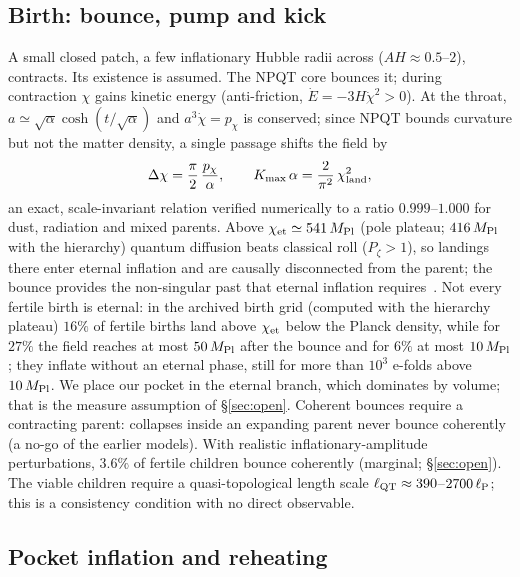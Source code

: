 \documentclass[11pt,a4paper]{article}
\newcommand{\Mpl}{M_{\rm Pl}}
\begin{document}
\subsection{Birth: bounce, pump and kick}
\label{sec:birth}

A small closed patch, a few inflationary Hubble radii across ($A H \approx 0.5$--$2$), contracts.
Its existence is assumed.
The NPQT core bounces it; during contraction $\chi$ gains kinetic energy (anti-friction, $\dot E = -3H\dot\chi^2 > 0$).
At the throat, $a\simeq\sqrt{\alpha}\cosh(t/\sqrt{\alpha})$ and $a^3\dot\chi = p_\chi$ is conserved; since NPQT bounds curvature but not the matter density, a single passage shifts the field by
\begin{equation}
\Delta\chi = \frac{\pi}{2}\,\frac{p_\chi}{\alpha},\qquad K_{\max}\,\alpha = \frac{2}{\pi^2}\,\chi_{\rm land}^2,
\label{eq:kick}
\end{equation}
an exact, scale-invariant relation verified numerically to a ratio $0.999$--$1.000$ for dust, radiation and mixed parents.
Above $\chi_{\rm et}\simeq 541\,\Mpl$ (pole plateau; $416\,\Mpl$ with the hierarchy) quantum diffusion beats classical roll ($P_\zeta>1$), so landings there enter eternal inflation and are causally disconnected from the parent; the bounce provides the non-singular past that eternal inflation requires~\cite{BGV2003}.
Not every fertile birth is eternal: in the archived birth grid (computed with the hierarchy plateau) $16\%$ of fertile births land above $\chi_{\rm et}$ below the Planck density, while for $27\%$ the field reaches at most $50\,\Mpl$ after the bounce and for $6\%$ at most $10\,\Mpl$; they inflate without an eternal phase, still for more than $10^3$ e-folds above $10\,\Mpl$. We place our pocket in the eternal branch, which dominates by volume; that is the measure assumption of \S\ref{sec:open}.
Coherent bounces require a contracting parent: collapses inside an expanding parent never bounce coherently (a no-go of the earlier models).
With realistic inflationary-amplitude perturbations, $3.6\%$ of fertile children bounce coherently (marginal; \S\ref{sec:open}).
The viable children require a quasi-topological length scale $\ell_{\rm QT}\approx 390$--$2700\,\ell_{\rm P}$; this is a consistency condition with no direct observable.

\subsection{Pocket inflation and reheating}
\label{sec:pocket}
\end{document}

